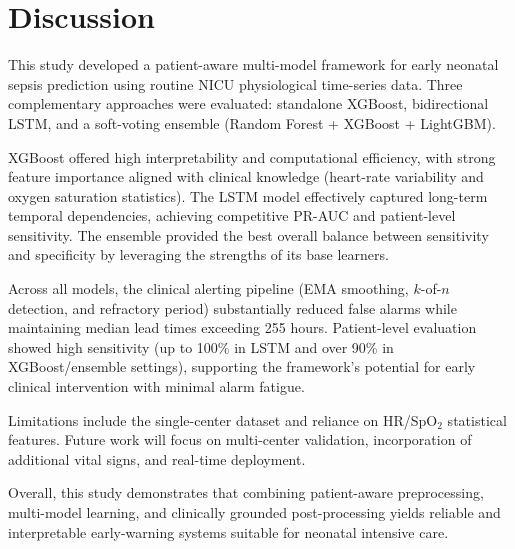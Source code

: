 \documentclass[conference]{IEEEtran}
\begin{document}
\section{Discussion}


This study developed a patient-aware multi-model framework for early neonatal sepsis prediction using routine NICU physiological time-series data. Three complementary approaches were evaluated: standalone XGBoost, bidirectional LSTM, and a soft-voting ensemble (Random Forest + XGBoost + LightGBM).

XGBoost offered high interpretability and computational efficiency, with strong feature importance aligned with clinical knowledge (heart-rate variability and oxygen saturation statistics). The LSTM model effectively captured long-term temporal dependencies, achieving competitive PR-AUC and patient-level sensitivity. The ensemble provided the best overall balance between sensitivity and specificity by leveraging the strengths of its base learners.

Across all models, the clinical alerting pipeline (EMA smoothing, $k$-of-$n$ detection, and refractory period) substantially reduced false alarms while maintaining median lead times exceeding 255 hours. Patient-level evaluation showed high sensitivity (up to 100\% in LSTM and over 90\% in XGBoost/ensemble settings), supporting the framework’s potential for early clinical intervention with minimal alarm fatigue.

Limitations include the single-center dataset and reliance on HR/SpO$_2$ statistical features. Future work will focus on multi-center validation, incorporation of additional vital signs, and real-time deployment.

Overall, this study demonstrates that combining patient-aware preprocessing, multi-model learning, and clinically grounded post-processing yields reliable and interpretable early-warning systems suitable for neonatal intensive care.




\end{document}
